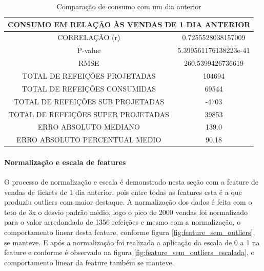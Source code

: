            \begin{table}[!ht]
           \centering
           \caption{Comparação de consumo com um dia anterior}
             \begin{tabular}{|c|c|}\hline
                \multicolumn{2}{c}{CONSUMO EM RELAÇÃO ÀS VENDAS DE 1 DIA ANTERIOR}\\ \hline
                CORRELAÇÃO (r) &  0.7255528038157009\\
                P-value &5.399561176138223e-41\\
                RMSE & 260.5399426736619\\
                TOTAL DE REFEIÇÕES PROJETADAS & 104694\\ 
                TOTAL DE REFEIÇÕES CONSUMIDAS & 69544\\
                TOTAL DE REFEIÇÕES SUB PROJETADAS & -4703\\
                TOTAL DE REFEIÇÕES SUPER PROJETADAS & 39853\\
                ERRO ABSOLUTO MEDIANO & 139.0\\
                ERRO ABSOLUTO PERCENTUAL MEDIO & 90.18\\\hline
            \end{tabular} \label{table:case1_vendas1} \end{table}

            \paragraph*{Normalização e escala de features}
                O processo de normalização e escala é demonstrado nesta seção com a feature de vendas de tickets de 1 dia anterior, pois entre todas as features esta é a que produziu outliers com maior destaque.
                A normalização dos dados é feita com o teto de 3x o desvio padrão médio, logo o pico de 2000 vendas foi normalizado para o valor arredondado de 1356 refeições e mesmo com a normalização, o comportamento linear desta feature, conforme figura \ref{fig:feature_sem_outliers}, se manteve.   
                E após a normalização foi realizada a aplicação da escala de 0 a 1 na feature e conforme é observado na figura  \ref{fig:feature_sem_outliers_escalada}, o comportamento linear da feature também se manteve.

